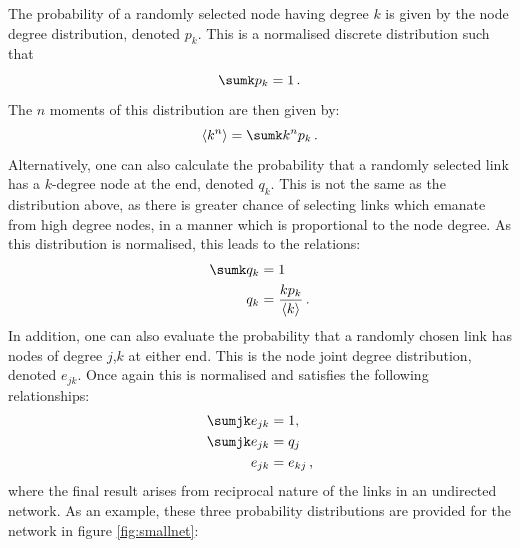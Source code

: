 The probability of a randomly selected node having degree $k$ is given by the node degree distribution, denoted $p_k$.
This is a normalised discrete distribution such that
\begin{equation}
	\label{eq:pknorm}
	\sumk p_k = 1 \,.
\end{equation}
The $n$\th{} moments of this distribution are then given by:
\begin{equation}
	\label{eq:pkmoment}
	\langle k^{n} \rangle = \sumk k^np_k \,.
\end{equation}
Alternatively, one can also calculate the probability that a randomly selected link has a $k$\--degree node at the end, denoted $q_k$.
This is not the same as the distribution above, as there is greater chance of selecting links which emanate from high degree nodes, in a manner which is proportional to the node degree.
As this distribution is normalised, this leads to the relations:
\begin{align}
	\sumk q_k &= 1 \label{eq:qknorm} \\
	q_k &= \frac{kp_k}{\langle k \rangle} \label{eq:qkpk} \,.
\end{align}
In addition, one can also evaluate the probability that a randomly chosen link has nodes of degree $j$,$k$ at either end.
This is the node joint degree distribution, denoted $e_{jk}$. 
Once again this is normalised and satisfies the following relationships:
\begin{align}
	\sumjk e_{jk} &= 1, \label{eq:ejknorm} \\
	\sumjk e_{jk} &= q_j \label{eq:ejkqk} \\
	e_{jk} &= e_{kj} \label{eq:ejkekj} \,,
\end{align}
where the final result arises from reciprocal nature of the links in an undirected network.
As an example, these three probability distributions are provided for the network in figure \ref{fig:smallnet}:
